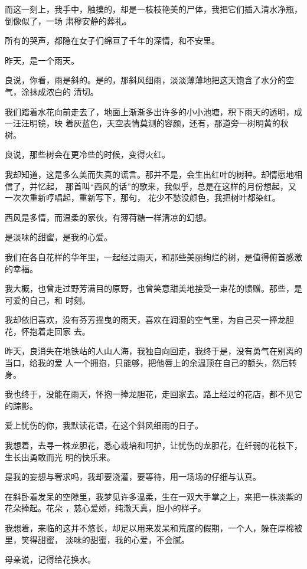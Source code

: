 \documentclass[12pt,a4paper]{article}
\def\blankrev{\vspace{1ex}}									%
\begin{document}
		而这一刻上，我手中，触摸的，却是一枝枝艳美的尸体，我把它们插入清水净瓶，倒像似了，一场
	肃穆安静的葬礼。

		所有的哭声，都隐在女子们绵亘了千年的深情，和不安里。

		\blankrev
		昨天，是一个雨天。

		良说，你看，雨是斜的。是的，那斜风细雨，淡淡薄薄地把这天饱含了水分的空气，涂抹成浓白的
	清切。

		我们踏着水花向前走去了，地面上渐渐多出许多的小小池塘，积下雨天的透明，成一汪汪明镜，映
	着灰蓝色，天空表情莫测的容颜，还有，那道旁一树明黄的秋树。

		良说，那些树会在更冷些的时候，变得火红。

		我却知道，这是多么美而失真的谎言。那并不是，会生出红叶的树种。却情愿地相信了，并忆起，
	那首叫“西风的话”的歌来，我似乎，总是在这样的月份想起，又一次次重新哼唱起，重新写下，那句，
	花少不愁没颜色，我把树叶都染红。

		西风是多情，而温柔的家伙，有薄荷糖一样清凉的幻想。

		是淡味的甜蜜，是我的心爱。

		我们在各自花样的华年里，一起经过雨天，和那些美丽绚烂的树，是值得俯首感激的幸福。


		我大概，也曾走过野芳满目的原野，也曾笑意甜美地接受一束花的馈赠。那些，是可爱的自己，和
	时刻。

		我却依旧喜欢，没有芬芳摇曳的雨天，喜欢在润湿的空气里，为自己买一捧龙胆花，怀抱着走回家
	去。

		昨天，良消失在地铁站的人山人海，我独自向回走，我终于是，没有勇气在别离的当口，给我的爱
	人一个拥抱，只能够，把他唇上的余温顶在自己的额头，然后转身。

		我也终于，没能在雨天，怀抱一捧龙胆花，走回家去。路上经过的花店，都不见它的踪影。

		爱上忧伤的你，我默读花语，在这个斜风细雨的日子。

		我想着，去寻一株龙胆花，悉心栽培和呵护，让忧伤的龙胆花，在纤弱的花枝下，生长出勇敢而光
	明的快乐来。

		是我的妄想与奢求吗，我却要浇灌，要等待，用一场场的仔细与认真。

		\blankrev

		在斜卧着发呆的空隙里，我梦见许多温柔，生在一双大手掌之上，来把一株淡紫的花朵捧起。花朵
	，慈心爱娇，纯澈天真，胆小的样子。

		我想着，来临的这并不悠长，却足以用来发呆和荒度的假期，一个人，躲在厚棉被里，笑得甜蜜，
	淡味的甜蜜，我的心爱，不会腻。


		母亲说，记得给花换水。
\end{document}
